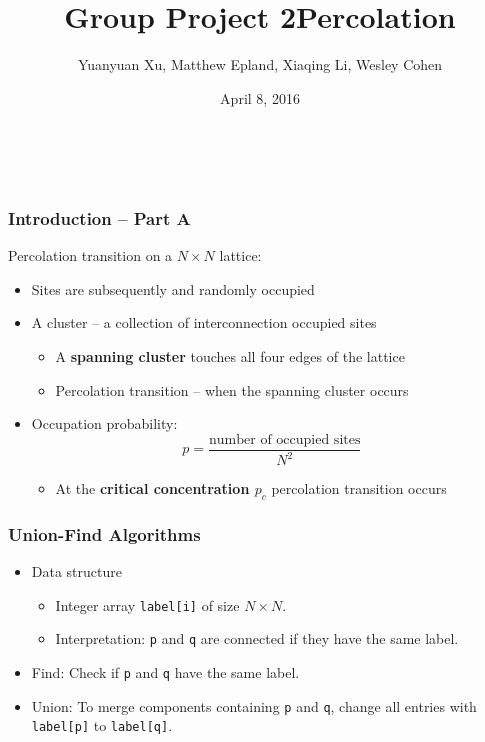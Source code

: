 \documentclass[mathserif,18pt,xcolor=table]{beamer}
\title[Group Project 2]{Group Project 2\newline Percolation}
\author[Xu, Epland, Li, Cohen]{{\small Yuanyuan Xu, Matthew Epland, Xiaqing Li, Wesley Cohen}}
\institute{Duke University}
\date{April 8, 2016}
\begin{document}
\beamertemplateballitem
\frame{\titlepage}

\


\begin{frame}
	\frametitle{Introduction -- Part A}
	Percolation transition on a $N\times N$ lattice:
	\begin{itemize}
		\item Sites are subsequently and randomly occupied
		\item A cluster -- a collection of interconnection occupied sites
		\begin{itemize}
			\item A \textbf{spanning cluster} touches all four edges of the lattice
			\item Percolation transition -- when the spanning cluster occurs
		\end{itemize}
		\item Occupation probability: 
			\begin{equation}
			p=\frac{\text{number of occupied sites}}{N^2}
			\end{equation}
		\begin{itemize}
			\item At the \textbf{critical concentration $p_c$} percolation transition occurs
		\end{itemize}
	\end{itemize}
\end{frame}


\begin{frame}
	\frametitle{Union-Find Algorithms}
	\begin{itemize}
		\item Data structure
			\begin{itemize}
			\item Integer array {\tt label[i]} of size $N\times N$.
			\item Interpretation: {\tt p} and {\tt q} are connected if they have the same label.
			\end{itemize}
		\item Find: Check if {\tt p} and {\tt q} have the same label.
		\item Union: To merge components containing {\tt p} and {\tt q}, change all entries with {\tt label[p]} to {\tt label[q]}.
	\end{itemize}
\end{frame}
\end{document}
